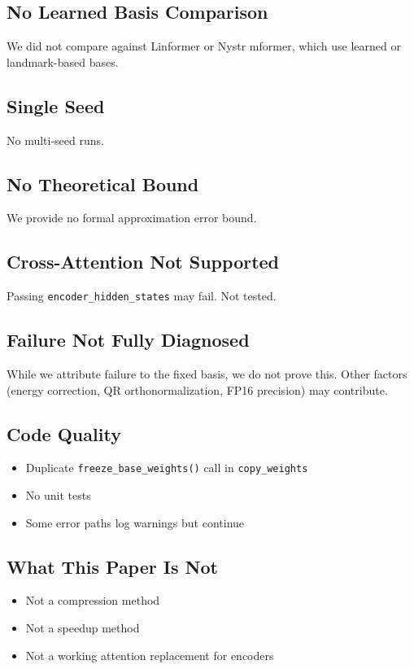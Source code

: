 \subsection{No Learned Basis Comparison}

We did not compare against Linformer or Nystr mformer, which use learned 
or landmark-based bases.

\subsection{Single Seed}

No multi-seed runs.

\subsection{No Theoretical Bound}

We provide no formal approximation error bound.

\subsection{Cross-Attention Not Supported}

Passing \texttt{encoder\_hidden\_states} may fail. Not tested.

\subsection{Failure Not Fully Diagnosed}

While we attribute failure to the fixed basis, we do not prove this. Other 
factors (energy correction, QR orthonormalization, FP16 precision) may 
contribute.

\subsection{Code Quality}

\begin{itemize}
\item Duplicate \texttt{freeze\_base\_weights()} call in \texttt{copy\_weights}
\item No unit tests
\item Some error paths log warnings but continue

\end{itemize}
\subsection{What This Paper Is Not}

\begin{itemize}
\item Not a compression method
\item Not a speedup method
\item Not a working attention replacement for encoders

\end{itemize}
